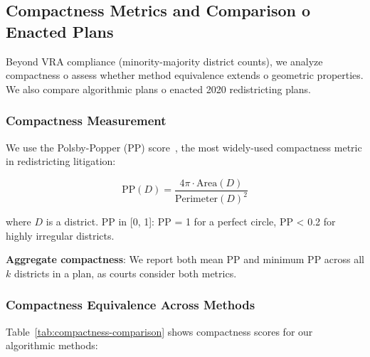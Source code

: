 \subsection{Compactness Metrics and Comparison 	o Enacted Plans}
\label{sec:compactness}

Beyond VRA compliance (minority-majority district counts), we analyze compactness 	o assess whether method equivalence extends 	o geometric properties. We also compare algorithmic plans 	o enacted 2020 redistricting plans.

\subsubsection{Compactness Measurement}

We use the Polsby-Popper (PP) score~\cite{polsby1991third}, the most widely-used compactness metric in redistricting litigation:

\[
\text{PP}(D) = \frac{4\pi \cdot \text{Area}(D)}{\text{Perimeter}(D)^2}
\]

where $D$ is a district. PP in [0, 1]: PP = 1 for a perfect circle, PP < 0.2 for highly irregular districts.

\textbf{Aggregate compactness}: We report both mean PP and minimum PP across all $k$ districts in a plan, as courts consider both metrics.

\subsubsection{Compactness Equivalence Across Methods}

Table~\ref{tab:compactness-comparison} shows compactness scores for our algorithmic methods:

